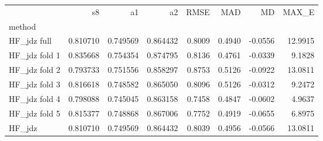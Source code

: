 \begin{tabular}{lrrrrrrr}
 & s8 & a1 & a2 & RMSE & MAD & MD & MAX_E \\
method &  &  &  &  &  &  &  \\
HF_jdz full & 0.810710 & 0.749569 & 0.864432 & 0.8009 & 0.4940 & -0.0556 & 12.9915 \\
HF_jdz fold 1 & 0.835668 & 0.754354 & 0.874795 & 0.8136 & 0.4761 & -0.0339 & 9.1828 \\
HF_jdz fold 2 & 0.793733 & 0.751556 & 0.858297 & 0.8753 & 0.5126 & -0.0922 & 13.0811 \\
HF_jdz fold 3 & 0.816618 & 0.748582 & 0.865050 & 0.8096 & 0.5126 & -0.0312 & 9.2472 \\
HF_jdz fold 4 & 0.798088 & 0.745045 & 0.863158 & 0.7458 & 0.4847 & -0.0602 & 4.9637 \\
HF_jdz fold 5 & 0.815377 & 0.748868 & 0.867006 & 0.7752 & 0.4919 & -0.0655 & 6.8975 \\
HF_jdz & 0.810710 & 0.749569 & 0.864432 & 0.8039 & 0.4956 & -0.0566 & 13.0811 \\
\end{tabular}
